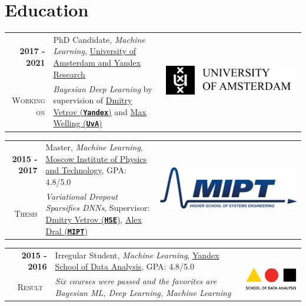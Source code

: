 \documentclass[a4paper,10pt]{article} %
\begin{document}

\section{Education}

\begin{tabular}{rp{14cm}c}	
	\textbf{2017 -  2021} & PhD Candidate, \emph{Machine Learning}, \href{https://mipt.ru/english}{University of Amsterdam and Yandex Research} & \multirow{2}{*}{\includegraphics[scale=0.015]{img/uva}}\\
	\textsc{Working on} & \emph{Bayesian Deep Learning} by supervision of \href{https://www.hse.ru/en/staff/dvetrov}{Dmitry Vetrov (\texttt{\textbf{Yandex}})} and \href{https://staff.fnwi.uva.nl/m.welling/}{Max Welling (\texttt{\textbf{UvA}})}
\end{tabular}

\begin{tabular}{rp{14cm}c}	
	\textbf{2015 -  2017} & Master, \emph{Machine Learning}, \href{https://mipt.ru/english}{Moscow Institute of Physics and Technology}, GPA: 4.8/5.0& \multirow{2}{*}{\includegraphics[scale=0.15]{img/mipt}}\\
	\textsc{Thesis} & \emph{Variational Dropout Sparsifies DNNs}, Supervisor: \href{https://www.hse.ru/en/staff/dvetrov}{Dmitry Vetrov (\texttt{\textbf{HSE}})}, \href{https://ru.linkedin.com/in/alexey-dral}{Alex Dral (\texttt{\textbf{MIPT}})}
\end{tabular}

\begin{tabular}{rp{14cm}c}	
	\textbf{2015 -  2016} & Irregular Student, \emph{Machine Learning}, \href{https://yandexdataschool.com/}{Yandex School of Data Analysis}, GPA: 4.8/5.0& \multirow{2}{*}{~~\includegraphics[scale=0.25]{img/shad}}\\
	\textsc{Result}~& \emph{Six courses were passed and the favorites are Bayesian ML, Deep Learning, Machine Learning}
\end{tabular}
\end{document}
